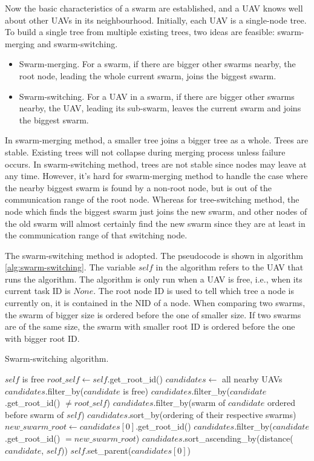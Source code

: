 Now the basic characteristics of a swarm are established,
and a UAV knows well about other UAVs in its neighbourhood. 
Initially, each UAV is a single-node tree.
To build a single tree from multiple existing trees,
two ideas are feasible: swarm-merging and swarm-switching.
\begin{itemize}
  \item Swarm-merging.
  For a swarm, if there are bigger other swarms nearby,
  the root node, leading the whole current swarm, joins the biggest swarm.
  \item Swarm-switching.
  For a UAV in a swarm, if there are bigger other swarms nearby,
  the UAV, leading its sub-swarm, leaves the current swarm and joins the biggest swarm.
\end{itemize}

In swarm-merging method, a smaller tree joins a bigger tree as a whole.
Trees are stable.
Existing trees will not collapse during merging process unless failure occurs.
In swarm-switching method, trees are not stable since nodes may leave at any time.
However, it's hard for swarm-merging method to handle the case
where the nearby biggest swarm is found by a non-root node,
but is out of the communication range of the root node.
Whereas for tree-switching method,
the node which finds the biggest swarm just joins the new swarm,
and other nodes of the old swarm will almost certainly find the new swarm
since they are at least in the communication range of that switching node.

The swarm-switching method is adopted.
The pseudocode is shown in algorithm \ref{alg:swarm-switching}.
The variable $self$ in the algorithm refers to the UAV that runs the algorithm.
The algorithm is only run when a UAV is free, i.e., when its current task ID is $None$.
The root node ID is used to tell which tree a node is currently on,
it is contained in the NID of a node.
When comparing two swarms, the swarm of bigger size is ordered before the one of smaller size.
If two swarms are of the same size,
the swarm with smaller root ID is ordered before the one with bigger root ID.

\begin{algorithm}
\caption{Swarm-switching algorithm.}
\label{alg:swarm-switching}
\begin{algorithmic}[1]
\Require $self$ is free
\State $root\_self \gets self$.get\_root\_id()
\State $candidates \gets$ all nearby UAVs
\State $candidates$.filter\_by($candidate$ is free)
\State $candidates$.filter\_by($candidate$.get\_root\_id() $\neq root\_self$)
\State $candidates$.filter\_by(swarm of $candidate$ ordered before swarm of $self$)
    \State $candidates$.sort\_by(ordering of their respective swarms)
    \State $new\_swarm\_root \gets candidates[0]$.get\_root\_id()
    \State $candidates$.filter\_by($candidate$.get\_root\_id() $= new\_swarm\_root$)
    \State $candidates$.sort\_ascending\_by(distance($candidate$, $self$))
    \State $self$.set\_parent($candidates[0]$)
\EndIf
\EndFunction
\end{algorithmic}
\end{algorithm}

